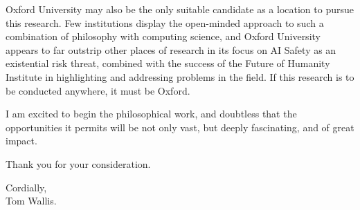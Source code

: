 Oxford University may also be the only suitable candidate as a location to pursue this research. Few institutions display the open-minded approach to such a combination of philosophy with computing science, and Oxford University appears to far outstrip other places of research in its focus on AI Safety as an existential risk threat, combined with the success of the Future of Humanity Institute in highlighting and addressing problems in the field. If this research is to be conducted anywhere, it must be Oxford.\par

I am excited to begin the philosophical work, and doubtless that the opportunities it permits will be not only vast, but deeply fascinating, and of great impact.\par\bigskip

Thank you for your consideration.

\bigskip
\begin{flushright}
    Cordially,\\
    Tom Wallis.
\end{flushright}




